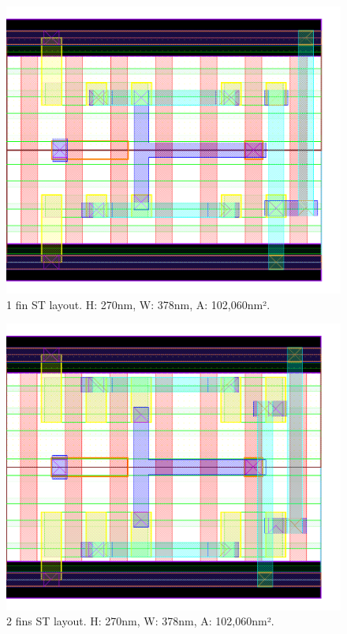 \documentclass[pgmicro,diss,english]{iiufrgs}
\begin{document}
\begin{figure}[]
\centering
\includegraphics[width=\textwidth,height=\textheight,keepaspectratio]{ST1F.png}
\caption{1 fin ST layout. H: 270nm, W: 378nm, A: 102,060nm².}
\label{fig:ST1F}
\end{figure}

\begin{figure}[]
\centering
\includegraphics[width=\textwidth,height=\textheight,keepaspectratio]{ST2F.png}
\caption{2 fins ST layout. H: 270nm, W: 378nm, A: 102,060nm².}
\label{fig:ST2F}
\end{figure}
\end{document}
